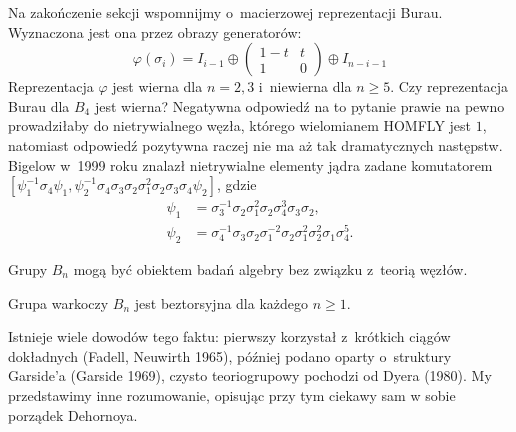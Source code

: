 Na zakończenie sekcji wspomnijmy o~macierzowej reprezentacji Burau.
Wyznaczona jest ona przez obrazy generatorów:
\[
    \varphi(\sigma_i) = I_{i-1} \oplus \begin{pmatrix}
        1-t & t \\
        1   & 0
    \end{pmatrix} \oplus I_{n-i-1}
\]
Reprezentacja $\varphi$ jest wierna dla $n = 2, 3$ i~niewierna dla $n \ge 5$.
Czy reprezentacja Burau dla $B_4$ jest wierna?
Negatywna odpowiedź na to pytanie prawie na pewno prowadziłaby do
nietrywialnego węzła, którego wielomianem HOMFLY jest $1$,
natomiast odpowiedź pozytywna raczej nie ma aż tak dramatycznych następstw.
Bigelow w~1999 roku znalazł nietrywialne elementy jądra zadane komutatorem $[\psi_1^{{-1}}\sigma_4\psi_1,\psi_2^{{-1}}\sigma_4\sigma_3\sigma_2\sigma_1^2\sigma_2\sigma_3\sigma_4\psi_2]$, gdzie
    \begin{align*}
        \psi_1 & = \sigma_3^{{-1}}\sigma_2\sigma_1^2\sigma_2\sigma_4^3\sigma_3\sigma_2, \\
\psi_2 & = \sigma_4^{{-1}}\sigma_3\sigma_2\sigma_1^{{-2}}\sigma_2\sigma_1^2\sigma_2^2\sigma_1\sigma_4^5.
    \end{align*}

Grupy $B_n$ mogą być obiektem badań algebry bez związku z~teorią węzłów.

\begin{proposition}
    Grupa warkoczy $B_n$ jest beztorsyjna dla każdego $n \ge 1$.
\end{proposition}

Istnieje wiele dowodów tego faktu: pierwszy korzystał z~krótkich ciągów dokładnych (Fadell, Neuwirth 1965), później podano oparty o~struktury Garside'a (Garside 1969), czysto teoriogrupowy pochodzi od Dyera (1980).
My przedstawimy inne rozumowanie, opisując przy tym ciekawy sam w sobie porządek Dehornoya.

